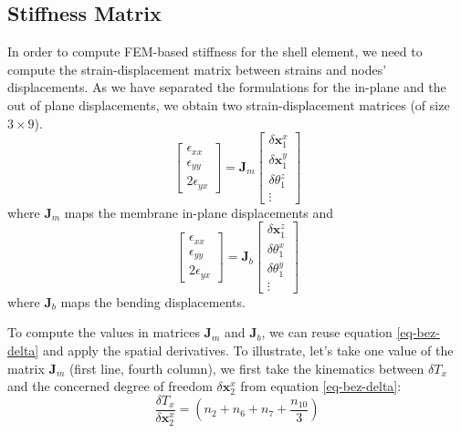 \documentclass{egpubl}
\newcommand{\mat}[1]{\mathbf{#1}}
\begin{document}

\subsection{Stiffness Matrix} %

In order to compute FEM-based stiffness for the shell element, we need to compute the strain-displacement matrix between strains and nodes' displacements.
As we have separated the formulations for the in-plane and the out of plane displacements, we obtain two strain-displacement matrices (of size $3\times9$).
\begin{equation}
    \begin{bmatrix}
        \epsilon_{xx} \\ \epsilon_{yy}  \\ 2\epsilon_{yx}
    \end{bmatrix}
    = \mat{J}_m 
    \begin{bmatrix}
        \delta \mat{x}_1^x \\ \delta \mat{x}_1^y \\ \delta \theta_1^z \\ \vdots
    \end{bmatrix}
\end{equation}
where $\mat{J}_m $ maps the membrane in-plane displacements and 
%
\begin{equation}
    \begin{bmatrix}
        \epsilon_{xx} \\ \epsilon_{yy}  \\ 2\epsilon_{yx}
    \end{bmatrix}
    = \mat{J}_b 
    \begin{bmatrix}
        \delta \mat{x}_1^z \\ \delta \theta_1^x \\ \delta \theta_1^y \\ \vdots
    \end{bmatrix}
\end{equation}
where $\mat{J}_b $ maps the bending displacements.

To compute the values in matrices $\mat{J}_m$ and $\mat{J}_b $,  we can reuse equation \eqref{eq-bez-delta} and apply the spatial derivatives.
To illustrate, let's take one value of the matrix $ \mat{J}_m $  (first line, fourth column), we first take the kinematics between $\delta T_x$ and the concerned degree of freedom $ \delta \mathbf{x}_2^x$ from equation \eqref{eq-bez-delta}:
\begin{equation}
    \frac{ \delta T_x }{ \delta \mathbf{x}_2^x } = (n_2 + n_6 + n_7 + \frac{n_{10}}{3})
\end{equation}
\end{document}
